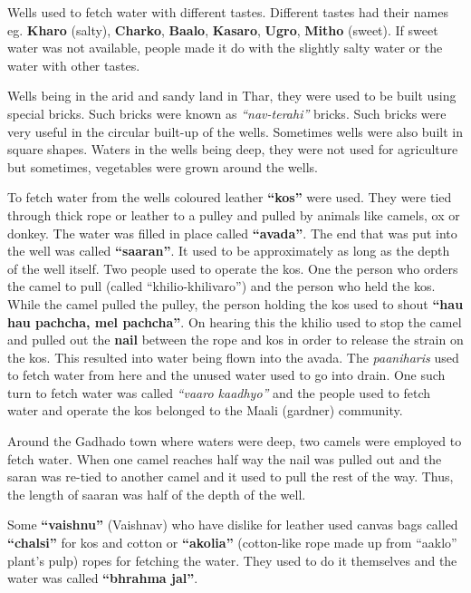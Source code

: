 Wells used to fetch water with different tastes. Different tastes had their
names eg. \textbf{Kharo} (salty), \textbf{Charko}, \textbf{Baalo}, \textbf{Kasaro},
\textbf{Ugro}, \textbf{Mitho} (sweet). If sweet water was not available, people made it
do with the slightly salty water or the water with other tastes.

Wells being in the arid and sandy land in Thar, they were used to be built using
special bricks. Such bricks were known as \textit{``nav-terahi''} bricks. Such bricks
were very useful in the circular built-up of the wells. Sometimes wells were
also built in square shapes. Waters in the wells being deep, they were not used
for agriculture but sometimes, vegetables were grown around the wells.

To fetch water from the wells coloured leather \textbf{``kos''} were used. They
were tied through thick rope or leather to a pulley and pulled by animals like
camels, ox or donkey. The water was filled in place called \textbf{``avada''}.
The end that was put into the well was called \textbf{``saaran''}. It used to be
approximately as long as the depth of the well itself. Two people used to
operate the kos. One the person who orders the camel to pull (called
``khilio-khilivaro'') and the person who held the kos. While the camel pulled
the pulley, the person holding the kos used to shout \textbf{``hau hau pachcha,
mel pachcha''}. On hearing this the khilio used to stop the camel and pulled out
the \textbf{nail} between the rope and kos in order to release the strain on the
kos. This resulted into water being flown into the avada. The
\textit{paaniharis} used to fetch water from here and the unused water used to
go into drain. One such turn to fetch water was called \textit{``vaaro kaadhyo''} and the
people used to fetch water and operate the kos belonged to the Maali (gardner) community.

Around the Gadhado town where waters were deep, two camels were employed to
fetch water. When one camel reaches half way the nail was pulled out and the
saran was re-tied to another camel and it used to pull the rest of the way.
Thus, the length of saaran was half of the depth of the well.

Some \textbf{``vaishnu''} (Vaishnav) who have dislike for leather used canvas
bags called \textbf{``chalsi''} for kos and cotton or \textbf{``akolia''}
(cotton-like rope made up from ``aaklo'' plant's pulp) ropes for fetching the
water. They used to do it themselves and the water was called \textbf{``bhrahma
jal''}.

